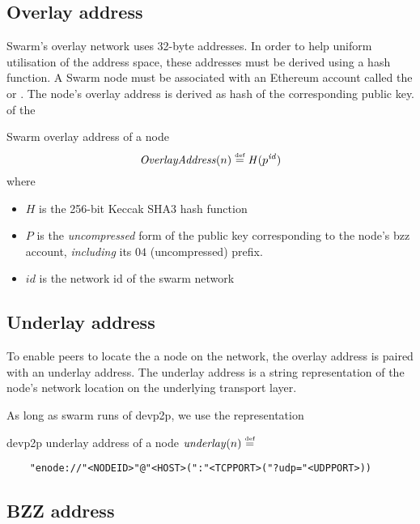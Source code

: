 \subsection{Overlay address}

Swarm's overlay network uses 32-byte addresses. In order to help  uniform utilisation of the address space,  these addresses must be derived using a hash function. A Swarm node must be associated with an Ethereum account called the  or .
The node's overlay address is derived as hash of the corresponding  public key.
 of the 

\begin{definition}{Swarm overlay address of a node}\label{def:overlay}
\begin{equation}
\mathit{OverlayAddress}(n) \overset{\textrm{\tiny def}}{=} \mathit{H}(p^\mathit{id})
\end{equation}
where
\begin{itemize}
    \item $H$ is the 256-bit Keccak SHA3 hash function
    \item $P$ is the \emph{uncompressed} form of the public key corresponding to the node's bzz account, \emph{including} its $04$ (uncompressed) prefix.
    \item $\mathit{id}$ is the network id of the swarm network
\end{itemize}
\end{definition}

\subsection{Underlay address}

To enable peers to locate the a node on the network, the overlay address is paired with an underlay address. The underlay address is a string representation of the node's network location on the underlying transport layer. 

As long as swarm runs of devp2p, we use the  representation \cite{ETHWIKI:ENODE}

\begin{definition}{devp2p underlay address of a node}\label{def:underlay}
$\mathit{underlay}(n) \overset{\textrm{\tiny def}}{=} $
\begin{verbatim}
    "enode://"<NODEID>"@"<HOST>(":"<TCPPORT>("?udp="<UDPPORT>))
\end{verbatim}
\end{definition}

\subsection{BZZ address}

